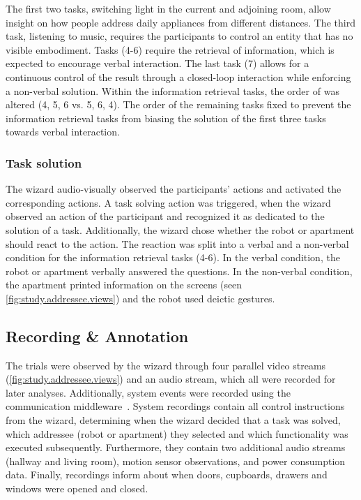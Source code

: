 The first two tasks, switching light in the current and adjoining room, allow insight on how people address daily appliances from different distances.
The third task, listening to music, requires the participants to control an entity that has no visible embodiment.
Tasks (4-6) require the retrieval of information, which is expected to encourage verbal interaction. 
The last task (7) allows for a continuous control of the result through a closed-loop interaction while enforcing a non-verbal solution. 
Within the information retrieval tasks, the order of was altered (4, 5, 6 vs. 5, 6, 4).
The order of the remaining tasks fixed to prevent the information retrieval tasks from biasing the solution of the first three tasks towards verbal interaction.

\subsubsection{Task solution}\label{sec:ch.address.sec.tasksolution}

The \gls{wizard} audio-visually observed the participants' actions and activated the corresponding actions.
A task solving action was triggered, when the \gls{wizard} observed an action of the participant and recognized it as dedicated to the solution of a task.
Additionally, the \gls{wizard} chose whether the \gls{robot} or \gls{apartment} should react to the action. 
The reaction was split into a verbal and a non-verbal condition for the information retrieval tasks (4-6).
In the verbal condition, the \gls{robot} or \gls{apartment} verbally answered the questions.
In the non-verbal condition, the \gls{apartment} printed information on the screens (seen \cref{fig:study.addressee.views}) and the \gls{robot} used deictic gestures.

\subsection{Recording \& Annotation}

The trials were observed by the \gls{wizard} through four parallel video streams (\cref{fig:study.addressee.views}) and an audio stream, which all were recorded for later analyses.
Additionally, system events were recorded using the communication middleware~\cite{rsbsoft}.
System recordings contain all control instructions from the \gls{wizard}, determining when the \gls{wizard} decided that a task was solved, which \gls{addressee} (\gls{robot} or \gls{apartment}) they selected and which functionality was executed subsequently.
Furthermore, they contain two additional audio streams (hallway and living room), motion sensor observations, and power consumption data.
Finally, recordings inform about when doors, cupboards, drawers and windows were opened and closed.


